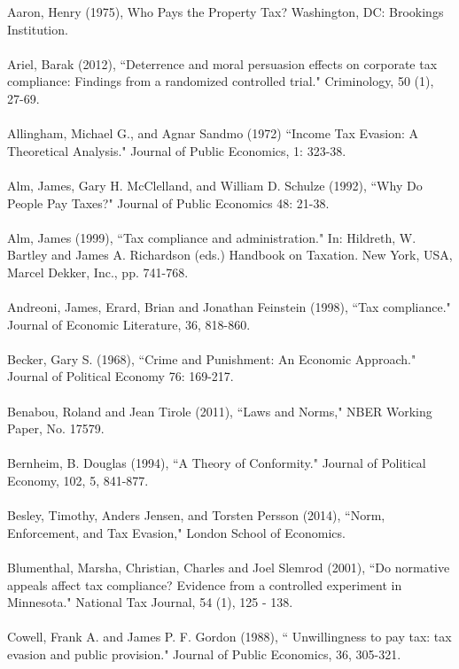 \documentclass[12pt,titlepage]{article}
\begin{document}
Aaron, Henry (1975), Who Pays the Property Tax? Washington, DC:
Brookings Institution. \\
\\
Ariel, Barak (2012), ``Deterrence and moral persuasion effects on
corporate tax compliance: Findings from a randomized controlled
trial." Criminology, 50 (1), 27-69. \\
\\
Allingham, Michael G., and Agnar Sandmo (1972) ``Income Tax Evasion: A
Theoretical Analysis." Journal of Public Economics, 1: 323-38. \\
\\
Alm, James, Gary H. McClelland, and William D. Schulze (1992), ``Why Do People
Pay Taxes?" Journal of Public Economics 48: 21-38. \\
\\
Alm, James (1999), ``Tax compliance and administration." In: Hildreth,
W. Bartley and James A. Richardson (eds.) Handbook on Taxation. New
York, USA, Marcel Dekker, Inc., pp. 741-768. \\ 
\\
Andreoni, James, Erard, Brian and Jonathan Feinstein (1998), ``Tax
compliance." Journal of Economic Literature, 36, 818-860. \\ 
\\
Becker, Gary S. (1968), ``Crime and Punishment: An Economic Approach."
Journal of Political Economy 76: 169-217.\\
\\
Benabou, Roland and Jean Tirole (2011), ``Laws and Norms," NBER
Working Paper, No. 17579. \\
\\
Bernheim, B. Douglas (1994), ``A Theory of Conformity." Journal of
Political Economy, 102, 5, 841-877. \\
\\
Besley, Timothy, Anders Jensen, and Torsten Persson (2014), ``Norm,
Enforcement, and Tax Evasion," London School of Economics.  \\ 
\\
Blumenthal, Marsha, Christian, Charles and Joel Slemrod (2001), ``Do
normative appeals affect tax compliance? Evidence from a controlled
experiment in Minnesota." National Tax Journal, 54 (1), 125 -
138. \\ 
\\ 
Cowell, Frank A. and James P. F. Gordon (1988), `` Unwillingness to
pay tax: tax evasion and public provision."  Journal of Public
Economics, 36, 305-321.\\ 
\end{document}

